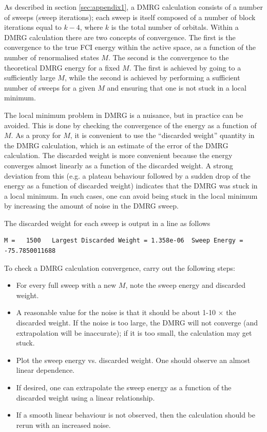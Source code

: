 \documentclass[letterpaper,12pt,aps, pra]{revtex4-1}
\begin{document}
As described in section \ref{sec:appendix1}, a DMRG calculation consists of a number of sweeps (sweep iterations); each sweep
is itself composed of a number of block iterations equal to $k-4$, where $k$ is the total number of orbitals. Within a DMRG calculation
there are two concepts of convergence. The first is the convergence to the true FCI energy within the active space, as a function
of the number of renormalised states $M$. The second is the convergence to the theoretical DMRG energy for a fixed $M$. The
first is achieved by going to a sufficiently large $M$, while the second is achieved by performing a sufficient number of sweeps for a given $M$ and ensuring
that one is not stuck in a local minimum.

The local minimum problem in DMRG is a nuisance, but in practice can be avoided.
This is done by checking the convergence of the energy as a function of $M$. 
As a proxy for $M$, it is convenient to use the ``discarded weight'' quantity in the DMRG calculation, which is an
estimate of the error of the DMRG calculation. The discarded weight is more convenient because the energy converges
almost linearly as a function of the discarded weight. A strong deviation from this (e.g. a plateau behaviour followed by a sudden drop 
of the energy as a function of discarded weight) indicates that the DMRG was stuck in a local minimum. In such cases,
one can avoid being stuck in the local minimum by increasing the amount of noise in the DMRG sweep.

The discarded weight for each sweep is output in a line as follows
\begin{verbatim}
M =   1500   Largest Discarded Weight = 1.358e-06  Sweep Energy =     -75.7850011688
\end{verbatim}

To check a DMRG calculation convergence, carry out the following steps:
\begin{itemize}
\item For every full sweep with a new $M$, note the sweep energy and discarded weight.
\item A reasonable value for the noise is that it should be about 1-10 $\times$ the discarded weight. If the noise
is too large, the DMRG will not converge (and extrapolation will be inaccurate); if it is too small, the calculation
may get stuck.
\item Plot the sweep energy vs. discarded weight. One should observe an almost linear dependence. 
\item If desired, one can extrapolate the sweep energy as a function of the discarded weight using a 
linear relationship. 
\item If a smooth linear behaviour is not observed, then the calculation should be rerun with an increased noise.
\end{itemize}
\end{document}
